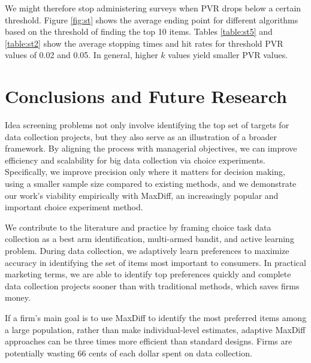 \documentclass[nonblindrev]{informs3}
\begin{document}
We might therefore stop administering surveys when PVR drops below a certain threshold. Figure \ref{fig:st} shows the average ending point for different algorithms based on the threshold of finding the top 10 items. Tables \ref{table:st5} and \ref{table:st2} show the average stopping times and hit rates for threshold PVR values of 0.02 and 0.05. In general, higher $k$ values yield smaller PVR values.



\section{Conclusions and Future Research}

Idea screening problems not only involve identifying the top set of targets for data collection projects, but they also serve as an illustration of a broader framework. By aligning the process with managerial objectives, we can improve efficiency and scalability for big data collection via choice experiments. Specifically, we improve precision only where it matters for decision making, using a smaller sample size compared to existing methods, and we demonstrate our work's viability empirically with MaxDiff, an increasingly popular and important choice experiment method.

We contribute to the literature and practice by framing choice task data collection as a best arm identification, multi-armed bandit, and active learning problem. During data collection, we adaptively learn preferences to maximize accuracy in identifying the set of items most important to consumers. In practical marketing terms, we are able to identify top preferences quickly and complete data collection projects sooner than with traditional methods, which saves firms money. 

If a firm's main goal is to use MaxDiff to identify the most preferred items among a large population, rather than make individual-level estimates, adaptive MaxDiff approaches can be three times more efficient than standard designs. Firms are potentially wasting 66 cents of each dollar spent on data collection.
\end{document}
